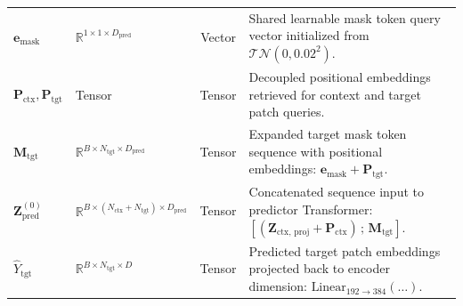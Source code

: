 \documentclass{article}
\begin{document}
\begin{table}[ht]
{\begin{tabular}{llcp{8.2cm}}
$\mathbf{e}_{\text{mask}}$ & $\mathbb{R}^{1 \times 1 \times D_{\text{pred}}}$ & Vector & Shared learnable mask token query vector initialized from $\mathcal{TN}(0, 0.02^2)$. \\
$\mathbf{P}_{\text{ctx}}, \mathbf{P}_{\text{tgt}}$ & Tensor & Tensor & Decoupled positional embeddings retrieved for context and target patch queries. \\
$\mathbf{M}_{\text{tgt}}$ & $\mathbb{R}^{B \times N_{\text{tgt}} \times D_{\text{pred}}}$ & Tensor & Expanded target mask token sequence with positional embeddings: $\mathbf{e}_{\text{mask}} + \mathbf{P}_{\text{tgt}}$. \\
$\mathbf{Z}_{\text{pred}}^{(0)}$ & $\mathbb{R}^{B \times (N_{\text{ctx}} + N_{\text{tgt}}) \times D_{\text{pred}}}$ & Tensor & Concatenated sequence input to predictor Transformer: $[ (\mathbf{Z}_{\text{ctx, proj}} + \mathbf{P}_{\text{ctx}}) \,;\, \mathbf{M}_{\text{tgt}} ]$. \\
$\hat{Y}_{\text{tgt}}$ & $\mathbb{R}^{B \times N_{\text{tgt}} \times D}$ & Tensor & Predicted target patch embeddings projected back to encoder dimension: $\text{Linear}_{192 \to 384}(\dots)$. \\
\bottomrule
\end{tabular}%
}
\end{table}
\end{document}
